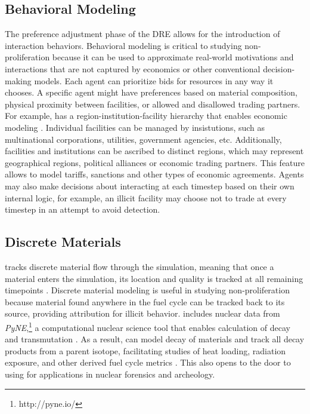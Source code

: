 \subsection{Behavioral Modeling}
The preference adjustment phase of the \gls{DRE} allows for the introduction of interaction behaviors.  Behavioral modeling is critical to studying non-proliferation because it can be used to approximate real-world motivations and interactions that are not captured by economics or other conventional decision-making models.  Each agent can prioritize bids for resources in any way it chooses. A specific agent might have preferences based on material composition, physical proximity between facilities, or allowed and disallowed trading partners. For example, \Cyclus has a region-institution-facility hierarchy that enables economic modeling \cite{oliver_geniusv2:_2009}.  Individual facilities can be managed by insistutions, such as multinational corporations, utilities, government agencies, etc.  Additionally, facilities and institutions can be ascribed to distinct regions, which may represent geographical regions, political alliances or economic trading partners. This feature allows \Cyclus to model tariffs, sanctions and other types of economic agreements.    Agents may also make decisions about interacting at each timestep based on their own internal logic, for example, an illicit facility may choose not to trade at every timestep in an attempt to avoid detection. 

\subsection{Discrete Materials}
\Cyclus tracks discrete material flow through the simulation, meaning that once a material enters the simulation, its location and quality is tracked at all remaining timepoints \cite{huff_integrated:_2013}. Discrete material modeling is useful in studying non-proliferation because material found anywhere in the fuel cycle can be tracked back to its source, providing attribution for illicit behavior. \Cyclus includes nuclear data from \emph{PyNE},\footnote{http://pyne.io/} a computational nuclear science tool that enables calculation of decay and transmutation \cite{Scopatz2012b}. As a result, \Cyclus can  model decay of materials and track all decay products from a parent isotope, facilitating studies of heat loading, radiation exposure, and other derived fuel cycle metrics \cite{scopatz_cymetric_2015}. This also opens to the door to using \Cyclus for applications in nuclear forensics and archeology.
